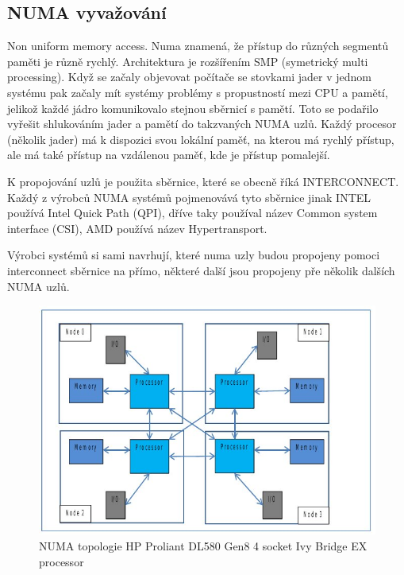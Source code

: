 \documentclass[a4paper,12pt]{article}
\begin{document}
\subsection{NUMA vyvažování}

Non uniform memory access. Numa znamená, že přístup do různých segmentů paměti je různě rychlý. Architektura je rozšířením SMP (symetrický multi processing). Když se začaly objevovat počítače se stovkami jader v jednom systému pak začaly mít systémy problémy s propustností mezi CPU a pamětí, jelikož každé jádro komunikovalo stejnou sběrnicí s pamětí. Toto se podařilo vyřešit shlukováním jader a pamětí do takzvaných NUMA uzlů. Každý procesor (několik jader) má k dispozici svou lokální paměť, na kterou má rychlý přístup, ale má také přístup na vzdálenou paměť, kde je přístup pomalejší.

K propojování uzlů je použita sběrnice, které se obecně říká INTERCONNECT. Každý z výrobců NUMA systémů pojmenovává tyto sběrnice jinak INTEL používá Intel Quick Path (QPI), dříve taky používal název Common system interface (CSI), AMD používá název Hypertransport.

Výrobci systémů si sami navrhují, které numa uzly budou propojeny pomoci interconnect sběrnice na přímo, některé další jsou propojeny pře několik dalších NUMA uzlů. 


\begin{figure}[ht]
\includegraphics[scale=0.78]{obrazky/numa-scheme.jpeg}
\caption{NUMA topologie HP Proliant DL580 Gen8 4 socket Ivy Bridge EX processor}
\label{NUMA scheme1}
\end{figure}
\end{document}
